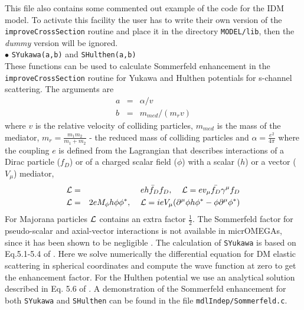 \documentclass[12pt,a4paper]{article}
\begin{document}
 This file also  contains some commented out example of the code for the IDM model.
 To activate this facility  the user has to write their own
version of the {\tt improveCrossSection} routine and place it  in the directory
\verb|MODEL/lib|,  then the {\it dummy} version will be ignored.
\\
%
\noindent$\bullet$ \verb|SYukawa(a,b)| and \verb|SHulthen(a,b)|   \\ 
These functions can be used  to calculate   Sommerfeld enhancement  in the {\tt improveCrossSection} routine for Yukawa and Hulthen potentials
for s-channel  scattering.  The arguments  are 
\begin{eqnarray}
   a &=& \alpha/v \\
   b &=& m_{med}/(m_r v)    
\end{eqnarray} 
where $v$ is the relative velocity of colliding particles, $m_{med}$ is the mass of the
mediator, $m_r=\frac{m_1 m_2}{m_1+m_2}$ - the reduced mass of colliding
particles and $\alpha=\frac{e^2}{4\pi}$ where the coupling $e$ is defined from the Lagrangian
that describes interactions of a Dirac particle ($f_D$)  or of a  charged  scalar field  ($\phi$)   with a scalar ($h$) or a vector ($V_\mu$) mediator, 
\begin{eqnarray}
 {\cal L}&=& e h \bar{f}_D f_D, \;\;\;\;  {\cal L}=e v_\mu \bar{f_D}\gamma^\mu f_D\nonumber\\
 {\cal L}&=&2e M_\phi h \phi\phi^*, \;\;\;\;  {\cal L}= i e V_\mu  (\partial^\mu \phi h \phi^* - \phi \partial^\mu \phi^*) 
\end{eqnarray}
For Majorana particles ${\cal L}$  contains an extra factor $\frac{1}{2}$.  
The Sommerfeld factor for  pseudo-scalar  and axial-vector   interactions is not available in micrOMEGAs, since it has been shown to be negligible  \cite{Agrawal:2020lea}. 
 The calculation of {\tt SYukawa} is based on Eq.5.1-5.4 of \cite{Iengo_2009}.  Here we solve numerically the differential equation for DM elastic scattering in spherical coordinates  and compute the wave function at zero to get the enhancement factor. For the  Hulthen potential we use an analytical solution described in  Eq. 5.6 of \cite{Slatyer:2009vg} . %
A  demonstration of the Sommerfeld enhancement for both {\tt SYukawa}  and {\tt  SHulthen} can be found  in the file {\tt mdlIndep/Sommerfeld.c}.
\end{document}
